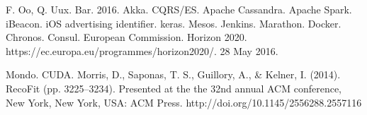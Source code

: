 \documentclass[a4paper, 10 pt, conference]{IEEEtran}
\begin{document}
\addtolength{\textheight}{-12cm}  %

\begin{thebibliography}{99}

 F. Oo, Q. Uux. Bar. 2016.
 Akka.
 CQRS/ES.
 Apache Cassandra.
 Apache Spark.
 iBeacon.
 iOS advertising identifier.
 keras.
 Mesos.
 Jenkins.
 Marathon.
 Docker.
 Chronos.
 Consul.
 European Commission. Horizon 2020. https://ec.europa.eu/programmes/horizon2020/. 28 May 2016.

 Mondo.
 CUDA.
 Morris, D., Saponas, T. S., Guillory, A., \& Kelner, I. (2014). RecoFit (pp. 3225--3234). Presented at the the 32nd annual ACM conference, New York, New York, USA: ACM Press. http://doi.org/10.1145/2556288.2557116

\end{thebibliography}
\end{document}
